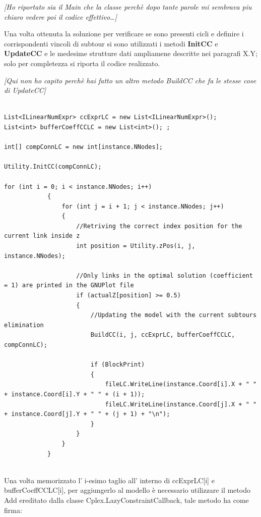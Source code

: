\documentclass[11pt]{article}
\begin{document}
\textit{[Ho riportato sia il Main che la classe perchè dopo tante parole mi sembrava piu chiaro vedere poi il codice effettivo…]}


Una volta ottenuta la soluzione per verificare se sono presenti cicli e definire i corrispondenti vincoli di subtour si sono utilizzati i metodi \textbf{InitCC} e \textbf{UpdateCC} e le medesime strutture dati ampliamene descritte nei paragrafi X.Y; solo per completezza si riporta il codice realizzato.



 \textit{[Qui non ho capito perchè hai fatto un altro metodo BuildCC che fa le stesse cose di UpdateCC]}


\begin{lstlisting}

List<ILinearNumExpr> ccExprLC = new List<ILinearNumExpr>();
List<int> bufferCoeffCCLC = new List<int>(); ;

int[] compConnLC = new int[instance.NNodes];

Utility.InitCC(compConnLC);

for (int i = 0; i < instance.NNodes; i++)
            {
                for (int j = i + 1; j < instance.NNodes; j++)
                {
                    //Retriving the correct index position for the current link inside z
                    int position = Utility.zPos(i, j, instance.NNodes);

                    //Only links in the optimal solution (coefficient = 1) are printed in the GNUPlot file
                    if (actualZ[position] >= 0.5)
                    {
                        //Updating the model with the current subtours elimination
                        BuildCC(i, j, ccExprLC, bufferCoeffCCLC, compConnLC);

                        if (BlockPrint)
                        {
                            fileLC.WriteLine(instance.Coord[i].X + " " + instance.Coord[i].Y + " " + (i + 1));
                            fileLC.WriteLine(instance.Coord[j].X + " " + instance.Coord[j].Y + " " + (j + 1) + "\n");
                        }
                    }
                }
            }


\end{lstlisting}



Una volta memorizzato l’ i-esimo taglio all’ interno di ccExprLC[i] e bufferCoeffCCLC[i], per aggiungerlo al modello è necessario utilizzare il metodo Add ereditato dalla classe Cplex.LazyConstraintCallback, tale metodo ha come firma:
\end{document}
